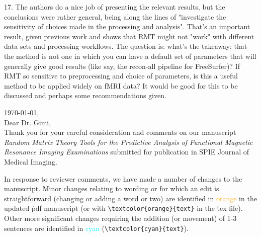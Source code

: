 \documentclass[10pt,letter]{article}
\begin{document}
{%





17. The authors do a nice job of presenting the relevant results, but the
conclusions were rather general, being along the lines of "investigate the
sensitivity of choices made in the processing and analysis". That's an
important result, given previous work and shows that RMT might not "work" with
different data sets and processing workflows. The question is: what's the
takeaway: that the method is not one in which you can have a default set of
parameters that will generally give good results (like say, the recon-all
pipeline for FreeSurfer)? If RMT so sensitive to preprocessing and choice of
parameters, is this a useful method to be applied widely on fMRI data? It would
be good for this to be discussed and perhaps some recommendations given.
}

\noindent
\today, \\
Dear Dr. Gimi, \\

Thank you for your careful consideration and comments on our manuscript
\emph{Random Matrix Theory Tools for the Predictive Analysis of Functional
Magnetic Resonance Imaging Examinations} submitted for publication in SPIE
Journal of Medical Imaging.

In response to reviewer comments, we have made a number of changes to the
manuscript. Minor changes relating to wording or for which an edit is
straightforward (changing or adding a word or two) are identified in
\textcolor{orange}{orange} in the updated \.pdf manuscript (or with
\verb|\textcolor{orange}{text}| in the \.tex file). Other more significant
changes requiring the addition (or movement) of 1-3 sentences are identified
in \textcolor{cyan}{cyan} (\verb|\textcolor{cyan}{text}|).
\end{document}
